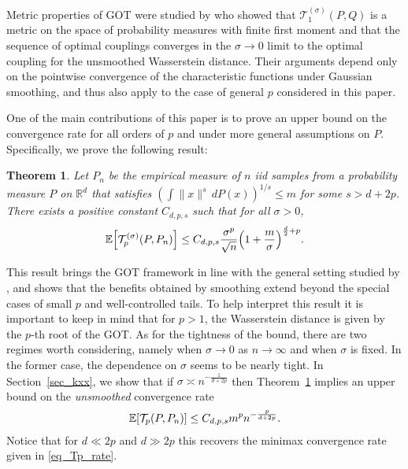 \documentclass{article}
\newtheorem{theorem}{Theorem}
\theoremstyle{definition}
\newcommand{\reals}{\mathbb{R}}
\newcommand{\ex}[1]{\ensuremath{\mathbb{E}\left[ #1\right]}}
\newcommand{\cT}{\mathcal{T}}
\let\originalleft\left
\let\originalright\right
\renewcommand{\left}{\mathopen{}\mathclose\bgroup\originalleft}
\renewcommand{\right}{\aftergroup\egroup\originalright}
\begin{document}
Metric properties of GOT were studied by \cite{goldfeld:2020} who showed that   $\cT_1^{(\sigma)}(P,Q)$ is a metric on the space of probability measures with finite first moment and that the sequence of optimal couplings converges in the $\sigma \to 0$ limit to the optimal coupling for the unsmoothed Wasserstein distance. Their arguments depend only on the pointwise convergence of the characteristic functions under Gaussian smoothing, and thus also apply to the case of general $p$ considered in this paper. 

One of the main contributions of this paper is to prove an upper bound on the convergence rate for all orders of $p$ and under more general assumptions on $P$. Specifically, we prove the following result:

\begin{theorem}\label{thm_GOT_moment_UB} Let $P_n$ be the empirical measure of $n$ iid samples from a probability measure $P$ on $\reals^d$ that satisfies $(\int \|x\|^s \, dP(x))^{1/s} \le m$ for some $s > d + 2p$. There exists a positive constant $C_{d,p,s}$ such that for all $\sigma > 0$, 
 \begin{align}
\ex{ \cT^{(\sigma)}_{p} (P, P_n) } \le C_{d,p,s} \frac{  \sigma^p}{\sqrt{n}}  \left( 1 + \frac{m}{\sigma} \right)^{\frac{d}{2} +p}.
\end{align}
\end{theorem}

This result brings the GOT framework in line with the general setting studied by \cite[Theorem~1]{fournier:2015}, and shows that the benefits obtained by smoothing extend  beyond the special cases of small $p$ and well-controlled tails. To help interpret this result it is important to keep in mind that for $p> 1$, the Wasserstein distance is given by the $p$-th root of the GOT. As for the tightness of the bound, there are two regimes worth considering,
namely when $\sigma\to 0$  as $n\to \infty$ and when $\sigma$ is fixed.
In the former case, the dependence on $\sigma$ seems to be nearly tight. In Section~\ref{sec_kxx}, we show that if $\sigma \asymp n^{-\frac{1}{ d+ 2p}}$ then Theorem~\ref{thm_GOT_moment_UB} implies an upper bound on the \emph{unsmoothed} convergence rate 
\begin{align}
\ex{ \cT_{p} (P, P_n) } \le C_{d,p,s} m^p n^{-\frac{p}{d + 2p}}. \label{eq:OT_near_optimal}
\end{align}
Notice that for $d \ll 2p$ and $d \gg 2p$ this recovers the minimax convergence rate given in \eqref{eq_Tp_rate}. 
\end{document}
